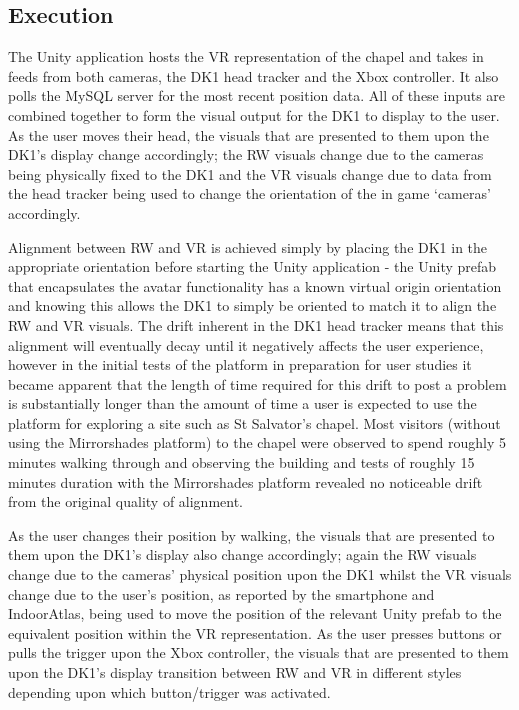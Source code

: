 
\subsection{Execution}
The Unity application hosts the VR representation of the chapel and takes in feeds from both cameras, the DK1 head tracker and the Xbox controller. It also polls the MySQL server for the most recent position data. All of these inputs are combined together to form the visual output for the DK1 to display to the user. As the user moves their head, the visuals that are presented to them upon the DK1's display change accordingly; the RW visuals change due to the cameras being physically fixed to the DK1 and the VR visuals change due to data from the head tracker being used to change the orientation of the in game `cameras' accordingly.

Alignment between RW and VR is achieved simply by placing the DK1 in the appropriate orientation before starting the Unity application - the Unity prefab that encapsulates the avatar functionality has a known virtual origin orientation and knowing this allows the DK1 to simply be oriented to match it to align the RW and VR visuals. The drift inherent in the DK1 head tracker means that this alignment will eventually decay until it negatively affects the user experience, however in the initial tests of the platform in preparation for user studies it became apparent that the length of time required for this drift to post a problem is substantially longer than the amount of time a user is expected to use the platform for exploring a site such as St Salvator's chapel. Most visitors (without using the Mirrorshades platform) to the chapel were observed to spend roughly 5 minutes walking through and observing the building and tests of roughly 15 minutes duration with the Mirrorshades platform revealed no noticeable drift from the original quality of alignment.

As the user changes their position by walking, the visuals that are presented to them upon the DK1's display also change accordingly; again the RW visuals change due to the cameras' physical position upon the DK1 whilst the VR visuals change due to the user's position, as reported by the smartphone and IndoorAtlas, being used to move the position of the relevant Unity prefab to the equivalent position within the VR representation. As the user presses buttons or pulls the trigger upon the Xbox controller, the visuals that are presented to them upon the DK1's display transition between RW and VR in different styles depending upon which button/trigger was activated.


